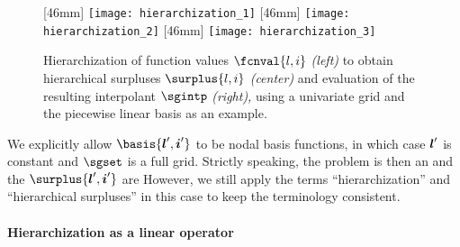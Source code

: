 \begin{figure}
  [46mm]{%
    \texttt{[image: hierarchization\_1]}%
  }%
  \hfill%
  [46mm]{%
    \texttt{[image: hierarchization\_2]}%
  }%
  \hfill%
  [46mm]{%
    \texttt{[image: hierarchization\_3]}%
  }%
  \caption[%
    Hierarchization of function values and evaluation of interpolant%
  ]{%
    Hierarchization of function values $\fcnval{l,i}$ \emph{(left)}
    to obtain hierarchical surpluses $\surplus{l,i}$ \emph{(center)} and
    evaluation of the resulting interpolant $\sgintp$ \emph{(right),}
    using a univariate grid and the piecewise linear basis as an example.%
  }%
  \label{fig:hierarchization}%
\end{figure}

We explicitly allow $\basis{\*l',\*i'}$ to be nodal basis functions,
in which case ${\boldsymbol{l}}'$ is constant and
$\sgset$ is a full grid.
Strictly speaking, the problem is then an 
and the $\surplus{\*l',\*i'}$ are 
However, we still apply the terms
``hierarchization'' and ``hierarchical surpluses'' in this case
to keep the terminology consistent.

\paragraph{Hierarchization as a linear operator}

